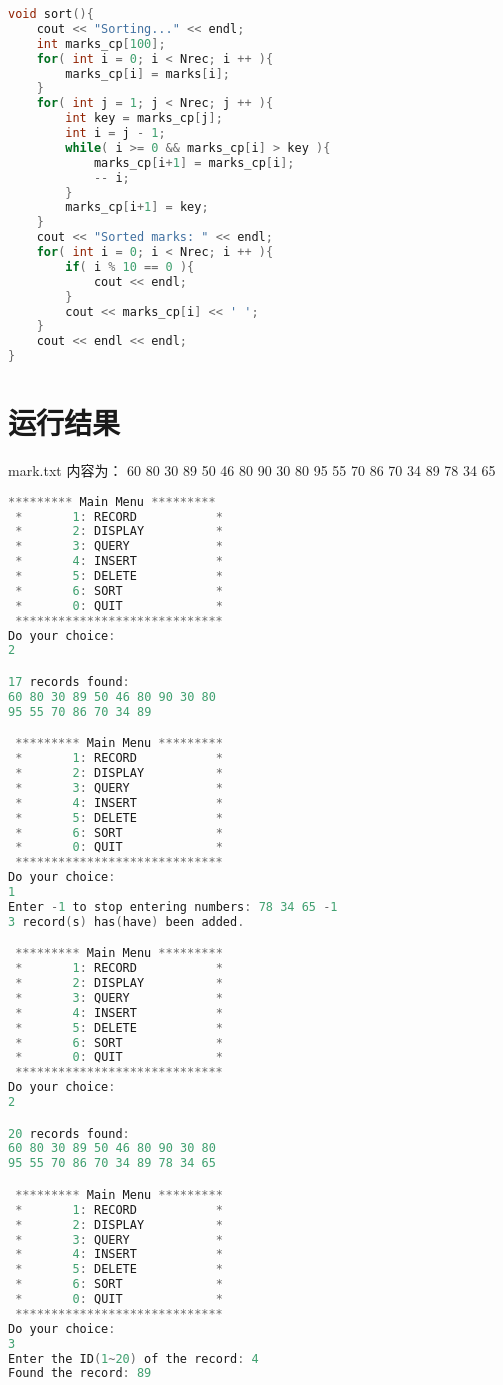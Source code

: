 \documentclass[14pt,aps,prb]{revtex4}
\begin{document}
\begin{spacing}{1.5}
\begin{lstlisting}[language=C++]
void sort(){
    cout << "Sorting..." << endl;
    int marks_cp[100];
    for( int i = 0; i < Nrec; i ++ ){
        marks_cp[i] = marks[i];
    }
    for( int j = 1; j < Nrec; j ++ ){
        int key = marks_cp[j];
        int i = j - 1;
        while( i >= 0 && marks_cp[i] > key ){
            marks_cp[i+1] = marks_cp[i];
            -- i;
        }
        marks_cp[i+1] = key;
    }
    cout << "Sorted marks: " << endl;
    for( int i = 0; i < Nrec; i ++ ){
        if( i % 10 == 0 ){
            cout << endl;
        }
        cout << marks_cp[i] << ' ';
    }
    cout << endl << endl;
}
\end{lstlisting}

\section{运行结果}
mark.txt 内容为：
60 80 30 89 50 46 80 90 30 80 95 55 70 86 70 34 89 78 34 65

\begin{lstlisting}[language=C++]
 ********* Main Menu *********
 *       1: RECORD           *
 *       2: DISPLAY          *
 *       3: QUERY            *
 *       4: INSERT           *
 *       5: DELETE           *
 *       6: SORT             *
 *       0: QUIT             *
 *****************************
Do your choice: 
2

17 records found: 
60 80 30 89 50 46 80 90 30 80 
95 55 70 86 70 34 89 

 ********* Main Menu *********
 *       1: RECORD           *
 *       2: DISPLAY          *
 *       3: QUERY            *
 *       4: INSERT           *
 *       5: DELETE           *
 *       6: SORT             *
 *       0: QUIT             *
 *****************************
Do your choice: 
1
Enter -1 to stop entering numbers: 78 34 65 -1
3 record(s) has(have) been added.

 ********* Main Menu *********
 *       1: RECORD           *
 *       2: DISPLAY          *
 *       3: QUERY            *
 *       4: INSERT           *
 *       5: DELETE           *
 *       6: SORT             *
 *       0: QUIT             *
 *****************************
Do your choice: 
2

20 records found: 
60 80 30 89 50 46 80 90 30 80 
95 55 70 86 70 34 89 78 34 65 

 ********* Main Menu *********
 *       1: RECORD           *
 *       2: DISPLAY          *
 *       3: QUERY            *
 *       4: INSERT           *
 *       5: DELETE           *
 *       6: SORT             *
 *       0: QUIT             *
 *****************************
Do your choice: 
3
Enter the ID(1~20) of the record: 4
Found the record: 89


\end{lstlisting}
\end{spacing}
\end{document}
